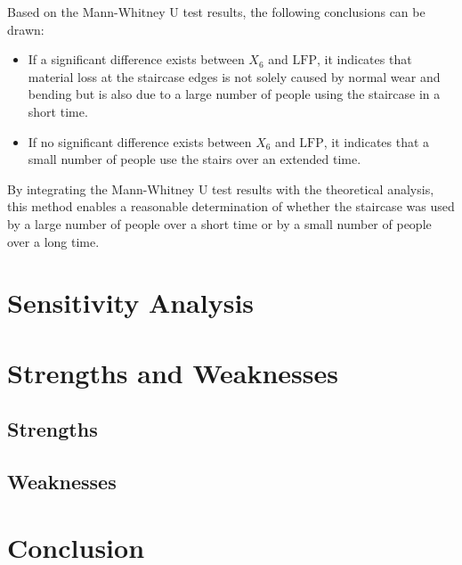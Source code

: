 \documentclass{mcmthesis}
\begin{document}
Based on the Mann-Whitney U test results, the following conclusions can be drawn:


\begin{itemize} 
\item If a significant difference exists between \( X_6 \) and \( \text{LFP} \), it indicates that material loss at the staircase edges is not solely caused by normal wear and bending but is also due to a large number of people using the staircase in a short time. 
\item If no significant difference exists between \( X_6 \) and \( \text{LFP} \), it indicates that a small number of people use the stairs over an extended time. 
\end{itemize}

By integrating the Mann-Whitney U test results with the theoretical analysis, this method enables a reasonable determination of whether the staircase was used by a large number of people over a short time or by a small number of people over a long time.


\section{Sensitivity Analysis}
\section{Strengths and Weaknesses}%
\subsection{Strengths}
\subsection{Weaknesses}
\section{Conclusion}

\newpage

\renewcommand{\refname}{References} %
\patchcmd{\thebibliography}{\section*}{\section*}{}{} %
\nocite{*}


\begin{appendices}  %

\end{appendices}  %
\end{document}
